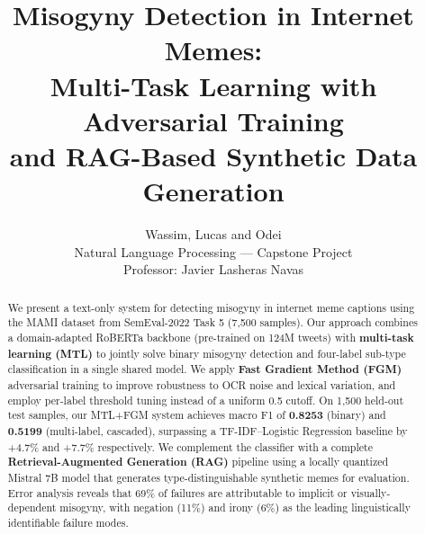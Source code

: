 \documentclass[11pt]{article}
\title{\textbf{Misogyny Detection in Internet Memes:\\
Multi-Task Learning with Adversarial Training\\
and RAG-Based Synthetic Data Generation}}
\author{
  Wassim, Lucas and Odei \\
  Natural Language Processing — Capstone Project \\
  Professor: Javier Lasheras Navas \\
}
\date{}
\begin{document}
\maketitle

\begin{abstract}
We present a text-only system for detecting misogyny in internet meme captions using the MAMI dataset from SemEval-2022 Task 5 (7,500 samples). Our approach combines a domain-adapted RoBERTa backbone (pre-trained on 124M tweets) with \textbf{multi-task learning (MTL)} to jointly solve binary misogyny detection and four-label sub-type classification in a single shared model. We apply \textbf{Fast Gradient Method (FGM)} adversarial training to improve robustness to OCR noise and lexical variation, and employ per-label threshold tuning instead of a uniform 0.5 cutoff. On 1{,}500 held-out test samples, our MTL+FGM system achieves macro F1 of \textbf{0.8253} (binary) and \textbf{0.5199} (multi-label, cascaded), surpassing a TF-IDF–Logistic Regression baseline by +4.7\% and +7.7\% respectively. We complement the classifier with a complete \textbf{Retrieval-Augmented Generation (RAG)} pipeline using a locally quantized Mistral 7B model that generates type-distinguishable synthetic memes for evaluation. Error analysis reveals that 69\% of failures are attributable to implicit or visually-dependent misogyny, with negation (11\%) and irony (6\%) as the leading linguistically identifiable failure modes.
\end{abstract}
\end{document}
